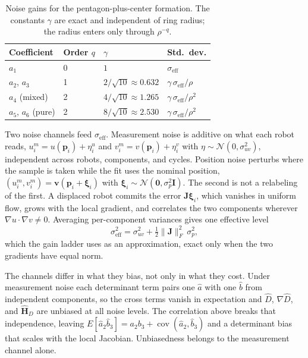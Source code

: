 \documentclass[lettersize,journal]{IEEEtran}
\begin{document}
\begin{table}[!t]
\caption{Noise gains for the pentagon-plus-center formation. The
constants $\gamma$ are exact and independent of ring radius; the radius
enters only through $\rho^{-q}$.}
\label{tab:gain_ladder}
\centering
\begin{tabular}{llll}
\hline
Coefficient & Order $q$ & $\gamma$ & Std.\ dev. \\
\hline
$a_1$ & 0 & $1$ & $\sigma_{\mathrm{eff}}$ \\
$a_2$, $a_3$ & 1 & $2/\sqrt{10} \approx 0.632$ &
    $\gamma\,\sigma_{\mathrm{eff}}/\rho$ \\
$a_4$ (mixed) & 2 & $4/\sqrt{10} \approx 1.265$ &
    $\gamma\,\sigma_{\mathrm{eff}}/\rho^2$ \\
$a_5$, $a_6$ (pure) & 2 & $8/\sqrt{10} \approx 2.530$ &
    $\gamma\,\sigma_{\mathrm{eff}}/\rho^2$ \\
\hline
\end{tabular}
\end{table}

Two noise channels feed $\sigma_{\mathrm{eff}}$. Measurement noise is
additive on what each robot reads, $u_i^m = u(\mathbf{p}_i) + \eta_i^u$
and $v_i^m = v(\mathbf{p}_i) + \eta_i^v$ with $\eta \sim
\mathcal{N}(0, \sigma_{uv}^2)$, independent across robots, components,
and cycles. Position noise perturbs where the sample is taken while the
fit uses the nominal position, $(u_i^m, v_i^m) =
\mathbf{v}(\mathbf{p}_i + \boldsymbol{\xi}_i)$ with
$\boldsymbol{\xi}_i \sim \mathcal{N}(\mathbf{0}, \sigma_p^2\mathbf{I})$.
The second is not a relabeling of the first. A displaced robot commits
the error $\mathbf{J}\boldsymbol{\xi}_i$, which vanishes in uniform
flow, grows with the local gradient, and correlates the two components
wherever $\nabla u \cdot \nabla v \neq 0$. Averaging per-component
variances gives one effective level
\begin{equation}
    \sigma_{\mathrm{eff}}^2 = \sigma_{uv}^2
        + \tfrac{1}{2}\lVert\mathbf{J}\rVert_F^2\,\sigma_p^2 ,
    \label{eq:sigma_eff}
\end{equation}
which the gain ladder uses as an approximation, exact only when the two
gradients have equal norm.

The channels differ in what they bias, not only in what they cost.
Under measurement noise each determinant term pairs one $\hat{a}$ with
one $\hat{b}$ from independent components, so the cross terms vanish in
expectation and $\hat{D}$, $\nabla\hat{D}$, and $\hat{\mathbf{H}}_D$
are unbiased at all noise levels. The correlation above breaks that
independence, leaving $E[\hat{a}_2\hat{b}_3] = a_2 b_3 +
\operatorname{cov}(\hat{a}_2, \hat{b}_3)$ and a determinant bias that
scales with the local Jacobian. Unbiasedness belongs to the measurement
channel alone.
\end{document}
